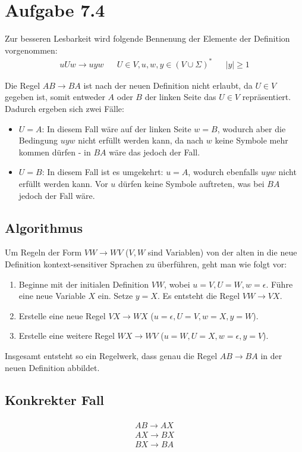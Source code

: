 \documentclass{article}
\begin{document}
\section*{Aufgabe 7.4}
Zur besseren Lesbarkeit wird folgende Bennenung der Elemente der Definition vorgenommen:
\begin{align*}
uUw \rightarrow uyw && U \in V, u,w,y \in \left( V \cup \Sigma \right)^* && |y| \geq 1
\end{align*}

Die Regel $AB\rightarrow BA$ ist nach der neuen Definition nicht erlaubt, da $U \in V$ gegeben ist, somit entweder $A$ oder $B$ der linken Seite das $U \in V$ repräsentiert. Dadurch ergeben sich zwei Fälle:
\begin{itemize}
	\item $U = A$: In diesem Fall wäre auf der linken Seite $w = B$, wodurch aber die Bedingung $uyw$ nicht erfüllt werden kann, da nach $w$ keine Symbole mehr kommen dürfen - in $BA$ wäre das jedoch der Fall.
  \item $U = B$: In diesem Fall ist es umgekehrt: $u = A$, wodurch ebenfalls $uyw$ nicht erfüllt werden kann. Vor $u$ dürfen keine Symbole auftreten, was bei $BA$ jedoch der Fall wäre.
\end{itemize}

\subsection*{Algorithmus}
Um Regeln der Form $VW \rightarrow WV$ ($V, W$ sind Variablen) von der alten in die neue Definition kontext-sensitiver Sprachen zu überführen, geht man wie folgt vor:

\begin{enumerate}
	\item Beginne mit der initialen Definition $VW$, wobei $u=V, U=W, w=\epsilon$. Führe eine neue Variable $X$ ein. Setze $y=X$. Es entsteht die Regel $VW \rightarrow VX$.
  \item Erstelle eine neue Regel $VX \rightarrow WX$ ($u=\epsilon, U=V, w=X, y=W$). 
  \item Erstelle eine weitere Regel $WX \rightarrow WV$ ($u=W, U=X, w=\epsilon, y=V$).
\end{enumerate}
Insgesamt entsteht so ein Regelwerk, dass genau die Regel $AB \rightarrow BA$ in der neuen Definition abbildet.

\subsection*{Konkrekter Fall}
\begin{align*}
\begin{array}{l}
AB \rightarrow AX \\
AX \rightarrow BX \\
BX \rightarrow BA
\end{array}
\end{align*}
\end{document}
